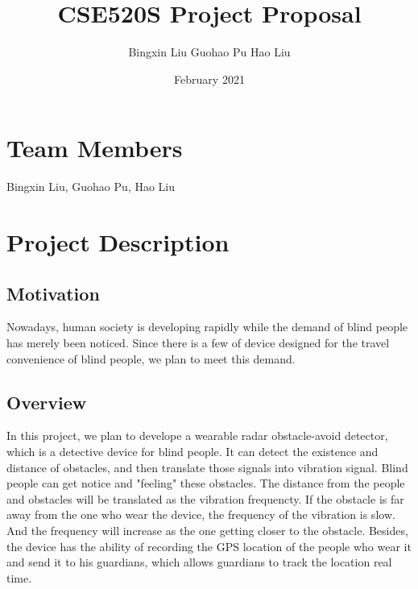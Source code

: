 \documentclass{article}
\title{CSE520S Project Proposal}
\author{Bingxin Liu Guohao Pu Hao Liu}
\date{February 2021}
\begin{document}
    \begin{titlepage}
        \maketitle
    \end{titlepage}


    \section{Team Members}
        \begin{flushleft}
            Bingxin Liu, Guohao Pu, Hao Liu\\
        \end{flushleft}
    \section{Project Description}
        \subsection{Motivation}
        Nowadays, human society is developing rapidly while the demand of blind people has merely been noticed. 
        Since there is a few of device designed for the travel convenience of blind people, we plan to meet this demand.  
        
        \subsection{Overview}
        In this project, we plan to develope a wearable radar obstacle-avoid detector, which is a detective device for blind people. It can detect the existence and distance of obstacles, and then translate those signals into vibration signal.  Blind people can get notice and "feeling" these obstacles. The distance from the people and obstacles will be translated as the vibration frequencty. If the obstacle is far away from the one who wear the device, the frequency of the vibration is slow. And the frequency will increase  as the one getting closer to the obstacle. Besides, the device has the ability of recording the GPS location of the people who wear it and send it to his guardians, which allows guardians to track the location real time.
\end{document}
